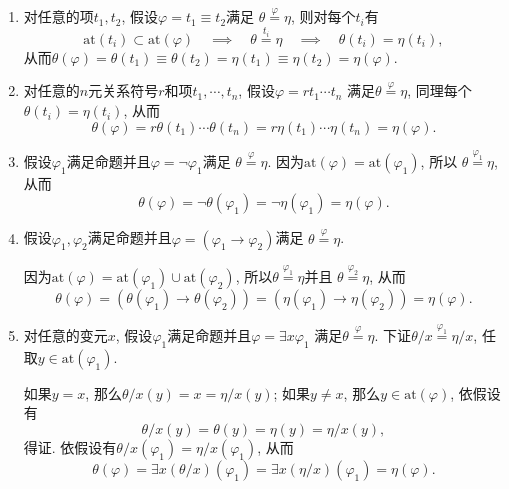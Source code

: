 \begin{enumerate}
    \item 对任意的项$t_1,t_2$, 假设$\varphi=t_1\equiv t_2$满足
    $\theta\overset{\displaystyle\varphi}{=}\eta$, 则对每个$t_i$有
    \[
        \mathrm{at}(t_i)\subset\mathrm{at}(\varphi)\quad\implies\quad
        \theta\overset{\displaystyle t_i}{=}\eta\quad\implies\quad
        \theta(t_i)=\eta(t_i),
    \]
    从而$\theta(\varphi)=\theta(t_1)\equiv\theta(t_2)=
    \eta(t_1)\equiv\eta(t_2)=\eta(\varphi)$.

    \item 对任意的$n$元关系符号$r$和项$t_1,\cdots,t_n$, 假设$\varphi=rt_1\cdots t_n$
    满足$\theta\overset{\displaystyle\varphi}{=}\eta$,
    同理每个$\theta(t_i)=\eta(t_i)$, 从而
    \[
        \theta(\varphi)=r\theta(t_1)\cdots\theta(t_n)=
        r\eta(t_1)\cdots\eta(t_n)=\eta(\varphi).
    \]

    \item 假设$\varphi_1$满足命题并且$\varphi=\neg\varphi_1$满足
    $\theta\overset{\displaystyle\varphi}{=}\eta$.
    因为$\mathrm{at}(\varphi)=\mathrm{at}(\varphi_1)$, 所以
    $\theta\overset{\displaystyle\varphi_1}{=}\eta$, 从而
    \[
        \theta(\varphi)=\neg\theta(\varphi_1)=\neg\eta(\varphi_1)=\eta(\varphi).
    \]

    \item 假设$\varphi_1,\varphi_2$满足命题并且$\varphi=(\varphi_1\to\varphi_2)$满足
    $\theta\overset{\displaystyle\varphi}{=}\eta$.

    \hspace{2.17em}
    因为$\mathrm{at}(\varphi)=\mathrm{at}(\varphi_1)\cup\mathrm{at}(\varphi_2)$,
    所以$\theta\overset{\displaystyle\varphi_1}{=}\eta$并且
    $\theta\overset{\displaystyle\varphi_2}{=}\eta$, 从而
    \[
        \theta(\varphi)=(\theta(\varphi_1)\to\theta(\varphi_2))=
        (\eta(\varphi_1)\to\eta(\varphi_2))=\eta(\varphi).
    \]

    \item 对任意的变元$x$, 假设$\varphi_1$满足命题并且$\varphi=\exists x\varphi_1$
    满足$\theta\overset{\displaystyle\varphi}{=}\eta$.
    下证$\theta/x\overset{\displaystyle\varphi_1}{=}\eta/x$,
    任取$y\in\mathrm{at}(\varphi_1)$.

    \hspace{2.17em}
    如果$y=x$, 那么$\theta/x(y)=x=\eta/x(y)$; 如果$y\neq x$,
    那么$y\in\mathrm{at}(\varphi)$, 依假设有
    \[
        \theta/x(y)=\theta(y)=\eta(y)=\eta/x(y),
    \]
    得证. 依假设有$\theta/x(\varphi_1)=\eta/x(\varphi_1)$, 从而
    \begin{equation*}
        \theta(\varphi)=\exists x(\theta/x)(\varphi_1)=
        \exists x(\eta/x)(\varphi_1)=\eta(\varphi).
    \tag*{\qedsymbol}\end{equation*}
\end{enumerate}





